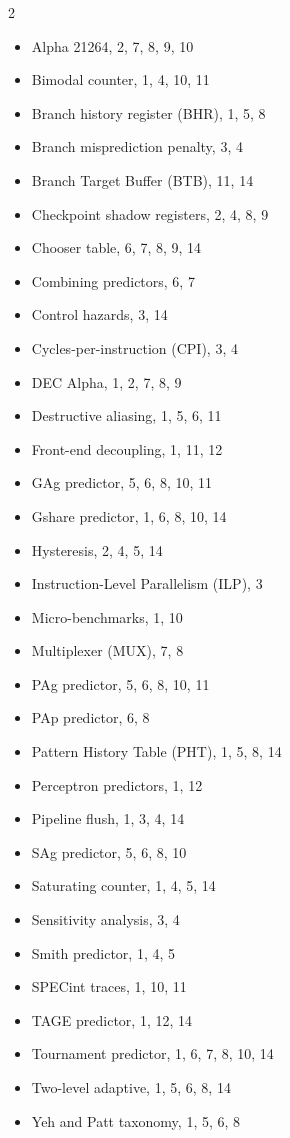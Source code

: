 \documentclass[11pt,a4paper]{article}
\begin{document}
\begin{multicols}{2}
\raggedright
\begin{itemize}[leftmargin=1.2em, itemsep=0.2em]\small
    \item Alpha 21264, 2, 7, 8, 9, 10
    \item Bimodal counter, 1, 4, 10, 11
    \item Branch history register (BHR), 1, 5, 8
    \item Branch misprediction penalty, 3, 4
    \item Branch Target Buffer (BTB), 11, 14
    \item Checkpoint shadow registers, 2, 4, 8, 9
    \item Chooser table, 6, 7, 8, 9, 14
    \item Combining predictors, 6, 7
    \item Control hazards, 3, 14
    \item Cycles-per-instruction (CPI), 3, 4
    \item DEC Alpha, 1, 2, 7, 8, 9
    \item Destructive aliasing, 1, 5, 6, 11
    \item Front-end decoupling, 1, 11, 12
    \item GAg predictor, 5, 6, 8, 10, 11
    \item Gshare predictor, 1, 6, 8, 10, 14
    \item Hysteresis, 2, 4, 5, 14
    \item Instruction-Level Parallelism (ILP), 3
    \item Micro-benchmarks, 1, 10
    \item Multiplexer (MUX), 7, 8
    \item PAg predictor, 5, 6, 8, 10, 11
    \item PAp predictor, 6, 8
    \item Pattern History Table (PHT), 1, 5, 8, 14
    \item Perceptron predictors, 1, 12
    \item Pipeline flush, 1, 3, 4, 14
    \item SAg predictor, 5, 6, 8, 10
    \item Saturating counter, 1, 4, 5, 14
    \item Sensitivity analysis, 3, 4
    \item Smith predictor, 1, 4, 5
    \item SPECint traces, 1, 10, 11
    \item TAGE predictor, 1, 12, 14
    \item Tournament predictor, 1, 6, 7, 8, 10, 14
    \item Two-level adaptive, 1, 5, 6, 8, 14
    \item Yeh and Patt taxonomy, 1, 5, 6, 8
\end{itemize}
\end{multicols}
\end{document}
